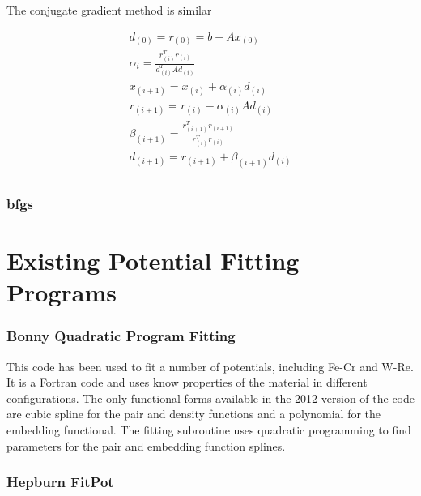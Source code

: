 The conjugate gradient method is similar

\begin{equation}
  \begin{split}
  d_{(0)} = r_{(0)} = b - A x_{(0)} \\  
  \alpha_{i} = \frac{r^{T}_{(i)} r_{(i)}}{d^{T}_{(i)} A d_{(i)}} \\
  x_{(i+1)} = x_{(i)} + \alpha_{(i)} d_{(i)} \\
  r_{(i+1)} = r_{(i)} - \alpha_{(i)} A d_{(i)} \\
  \beta_{(i+1)} = \frac{r^{T}_{(i+1)} r_{(i+1)}} {r^{T}_{(i)} r_{(i)}} \\
  d_{(i + 1)} = r_{(i + 1)} + \beta_{(i+1)} d_{(i)}\\
  \end{split}
  \label{eq:conjugategradient}
\end{equation}


\subsubsection{\acrfull{bfgs}}






\section{Existing Potential Fitting Programs}
\label{section:fittingprograms}

\subsubsection{Bonny Quadratic Program Fitting}

This code has been used to fit a number of potentials, including Fe-Cr and W-Re.  It is a Fortran code and uses know properties of the material in different configurations.  The only functional forms available in the 2012 version of the code are cubic spline for the pair and density functions and a polynomial for the embedding functional.  The fitting subroutine uses quadratic programming to find parameters for the pair and embedding function splines.




\subsubsection{Hepburn FitPot}

